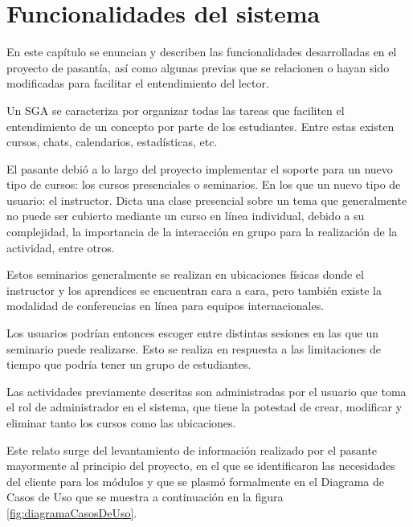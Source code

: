 \chapter{Funcionalidades del sistema}
\thispagestyle{empty} %
\glsresetall

En este capítulo se enuncian y describen las funcionalidades desarrolladas en el proyecto de pasantía, así como algunas previas que se relacionen o hayan sido modificadas para facilitar el entendimiento del lector.

Un \gls{SGA} se caracteriza por organizar todas las tareas que faciliten el entendimiento de un concepto por parte de los estudiantes. Entre estas existen cursos, chats, calendarios, estadísticas, etc.

El pasante debió a lo largo del proyecto implementar el soporte para un nuevo tipo de cursos: los cursos presenciales o seminarios. En los que un nuevo tipo de usuario: el instructor. Dicta una clase presencial sobre un tema que generalmente no puede ser cubierto mediante un curso en línea individual, debido a su complejidad, la importancia de la interacción en grupo para la realización de la actividad, entre otros.

Estos seminarios generalmente se realizan en ubicaciones físicas donde el instructor y los aprendices se encuentran cara a cara, pero también existe la modalidad de conferencias en línea para equipos internacionales.

Los usuarios podrían entonces escoger entre distintas sesiones en las que un seminario puede realizarse. Esto se realiza en respuesta a las limitaciones de tiempo que podría tener un grupo de estudiantes.

Las actividades previamente descritas son administradas por el usuario que toma el rol de administrador en el sistema, que tiene la potestad de crear, modificar y eliminar tanto los cursos como las ubicaciones.

Este relato surge del levantamiento de información realizado por el pasante mayormente al principio del proyecto, en el que se identificaron las necesidades del cliente para los módulos y que se plasmó formalmente en el Diagrama de Casos de Uso que se muestra a continuación en la figura \ref{fig:diagramaCasosDeUso}.


